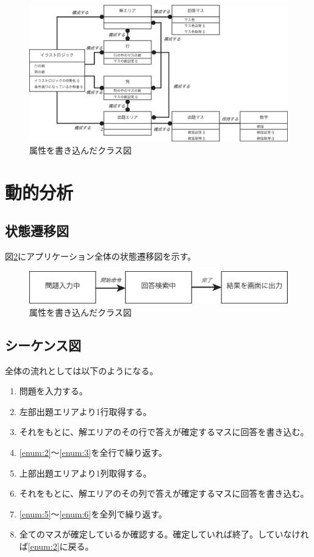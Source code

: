 \documentclass[a4j]{jarticle}
\begin{document}
\begin{figure}[hp]
\centering
\includegraphics[width=15cm]{./image/class-attribute.eps}
\caption{属性を書き込んだクラス図}
\label{fig:class-attribute}
\end{figure}

\section{動的分析}
\subsection{状態遷移図}
図\ref{fig:state-transition}にアプリケーション全体の状態遷移図を示す。

\begin{figure}[hp]
\centering
\includegraphics[width=15cm]{./image/state-transition.eps}
\caption{属性を書き込んだクラス図}
\label{fig:state-transition}
\end{figure}

\subsection{シーケンス図}
全体の流れとしては以下のようになる。
\begin{enumerate}
 \item 問題を入力する。
 \item 左部出題エリアより1行取得する。\label{enum:2}
 \item それをもとに、解エリアのその行で答えが確定するマスに回答を書き込む。\label{enum:3}
 \item \ref{enum:2}〜\ref{enum:3}を全行で繰り返す。
 \item 上部出題エリアより1列取得する。\label{enum:5}
 \item それをもとに、解エリアのその列で答えが確定するマスに回答を書き込む。\label{enum:6}
 \item \ref{enum:5}〜\ref{enum:6}を全列で繰り返す。
 \item 全てのマスが確定しているか確認する。確定していれば終了。していなければ\ref{enum:2}に戻る。
\end{enumerate}
\end{document}
